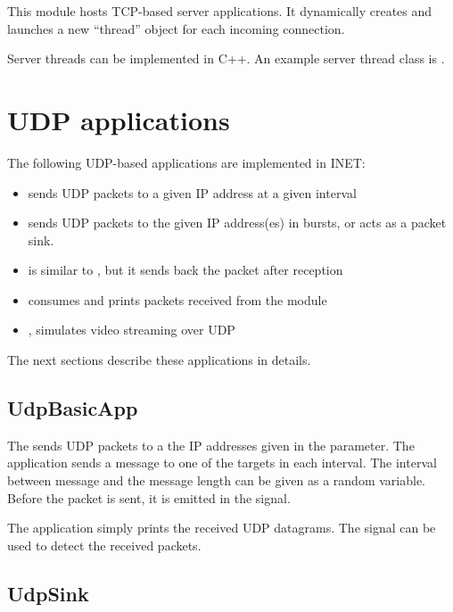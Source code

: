 This module hosts TCP-based server applications. It dynamically creates
and launches a new ``thread'' object for each incoming connection.

Server threads can be implemented in C++. An example server thread class is
.


\section{UDP applications}
\label{sec:apps:udp-applications}

The following UDP-based applications are implemented in INET:

\begin{itemize}
\item {} sends UDP packets to a given IP address at a given interval
\item {} sends UDP packets to the given IP address(es) in bursts, or acts as a packet sink.
\item {} is similar to , but it sends back the packet after reception
\item {} consumes and prints packets received from the  module
\item {}, simulates video streaming over UDP
\end{itemize}

The next sections describe these applications in details.

\subsection{UdpBasicApp}
\label{sec:apps:udpbasicapp}

The  sends UDP packets to a the IP addresses given in the
 parameter. The application sends a message to one of the
targets in each  interval. The interval between message and
the message length can be given as a random variable. Before the packet is
sent, it is emitted in the  signal.

The application simply prints the received UDP datagrams. The 
signal can be used to detect the received packets.

\subsection{UdpSink}
\label{sec:apps:udpsink}


